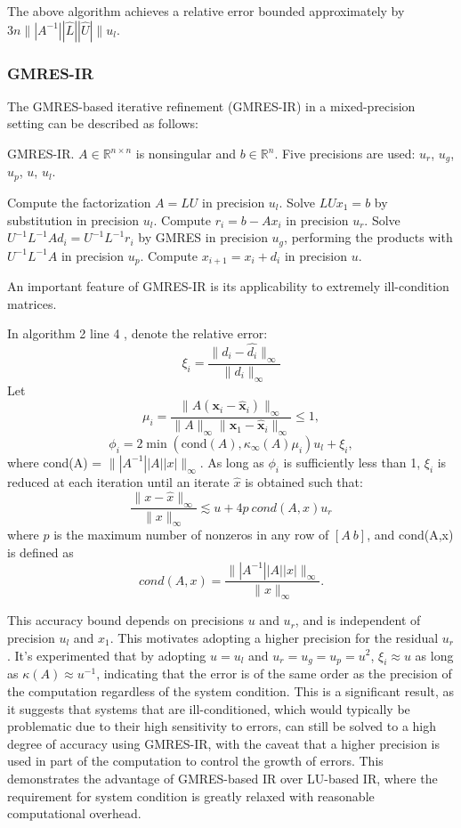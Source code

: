 The above algorithm achieves a relative error bounded approximately by $3n\||A^{-1}||\hat{L}||\hat{U}|\|u_l$.


\subsubsection{GMRES-IR}
The GMRES-based iterative refinement (GMRES-IR) in a mixed-precision setting can be described as follows:

\begin{algorithm}
    \caption{GMRES-IR. $A \in \mathbb{R}^{n \times n}$ is nonsingular and $b \in \mathbb{R}^n$. Five precisions are used: $u_r$, $u_g$, $u_p$, $u$, $u_l$.}
    \begin{algorithmic}[1]
        \State Compute the factorization $A = LU$ in precision $u_l$.
        \State Solve $LUx_1 = b$ by substitution in precision $u_l$.
            \State Compute $r_i = b - Ax_i$ in precision $u_r$.
            \State Solve $U^{-1}L^{-1}Ad_i = U^{-1}L^{-1}r_i$ by GMRES in precision $u_g$, performing the products with $U^{-1}L^{-1}A$ in precision $u_p$.
            \State Compute $x_{i+1} = x_i + d_i$ in precision $u$.
        \EndFor
    \end{algorithmic}
\end{algorithm}

An important feature of GMRES-IR is its applicability to extremely ill-condition matrices.

In algorithm 2 line 4 , denote the relative error:
\[
    \xi_i = \frac{\|d_i - \hat{d_i}\|_{\infty}}{\|d_i\|_{\infty}}
\]
Let
\[
\mu_i = \frac{\|A(\mathbf{x}_i - \hat{\mathbf{x}}_i)\|_{\infty}}{\|A\|_{\infty}\|\mathbf{x}_1 - \hat{\mathbf{x}}_i\|_{\infty}} \leq 1,
\]
\[
\phi_i = 2 \min(\text{cond}(A), \kappa_{\infty}(A)\mu_i) u_l + \xi_i,
\]
where cond(A) = $\||A^{-1}||A||x|\|_\infty$.
As long as $\phi_i$ is sufficiently less than 1, $\xi_i$ is reduced at each iteration until an iterate $\hat{x}$ is obtained such that:
\[
    \frac{\|x - \hat{x}\|_{\infty}}{\|x\|_{\infty}} \lesssim u+4p\ cond(A,x)u_r
\]
where $p$ is the maximum number of nonzeros in any row of $[A\ b]$, and cond(A,x) is defined as
\[
cond(A,x)=\frac{\||A^{-1}||A||x|\|_{\infty}}{\|x\|_{\infty}}.
\]


This accuracy bound depends on precisions $u$ and $u_r$, and is independent of precision $u_l$ and $x_1$. This motivates adopting a higher precision for the residual $u_r$. It's experimented that by adopting $u=u_l$ and $u_r=u_g=u_p=u^2$, $\xi_i\approx u$ as long as $\kappa(A)\approx u^{-1}$, indicating that the error is of the same order as the precision of the computation regardless of the system condition. This is a significant result, as it suggests that systems that are ill-conditioned, which would typically be problematic due to their high sensitivity to errors, can still be solved to a high degree of accuracy using GMRES-IR, with the caveat that a higher precision is used in part of the computation to control the growth of errors. This demonstrates the advantage of GMRES-based IR over LU-based IR, where the requirement for system condition is greatly relaxed with reasonable computational overhead\cite{Boris2021}. 
\clearpage




